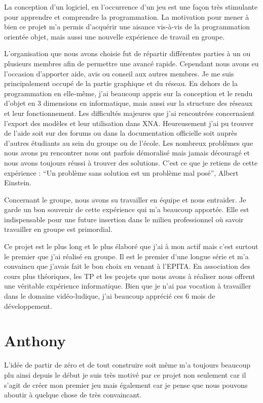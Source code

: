\documentclass[11pt]{report}
\begin{document}
La conception d’un logiciel, en l’occurrence d’un jeu est une façon très stimulante pour apprendre et comprendre la programmation. La motivation pour mener à bien ce projet m’a permis d’acquérir une aisance vis-à-vis de la programmation orientée objet, mais aussi une nouvelle expérience de travail en groupe.

L’organisation que nous avons choisie fut de répartir différentes parties à un ou plusieurs membres afin de permettre une avancé rapide. Cependant nous avons eu l’occasion d’apporter aide, avis ou conseil aux autres membres.  Je me suis principalement occupé de la partie graphique et du réseau. En dehors de la programmation en elle-même, j’ai beaucoup appris sur la conception et le rendu d’objet en 3 dimensions en informatique, mais aussi sur la structure des réseaux et leur fonctionnement. Les difficultés majeures que j’ai rencontrées concernaient l’export des modèles et leur utilisation dans XNA. Heureusement j’ai pu trouver de l’aide soit sur des forums ou dans la documentation officielle soit auprès d’autres étudiants au sein du groupe ou de l’école. Les nombreux problèmes que nous avons pu rencontrer nous ont parfois démoralisé mais jamais découragé et nous avons toujours réussi à trouver des solutions. C’est ce que je retiens de cette expérience : ``Un problème sans solution est un problème mal posé'', Albert Einstein.

Concernant le groupe, nous avons su travailler en équipe et nous entraider. Je garde un bon souvenir de cette expérience qui m’a beaucoup apportée. Elle est indispensable pour une future insertion dans le milieu professionnel où savoir travailler en groupe est primordial.

Ce projet est le plus long et le plus élaboré que j’ai à mon actif mais c’est surtout le premier que j’ai réalisé en groupe. Il est le premier d’une longue série et m’a convaincu que j’avais fait le bon choix en venant à l’EPITA. En association des cours plus théoriques, les TP et les projets que nous avons à réaliser nous offrent une véritable expérience informatique. Bien que je n’ai pas vocation à travailler dans le domaine vidéo-ludique, j’ai beaucoup apprécié ces 6 mois de développement.

\section{Anthony}

L'idée de partir de zéro et de tout construire soit même m'a toujours beaucoup plu ainsi depuis le début je suis très motivé par ce projet non seulement car il s'agit de créer mon premier jeu mais également car je pense que nous pouvons aboutir à quelque chose de très convaincant.
\end{document}
